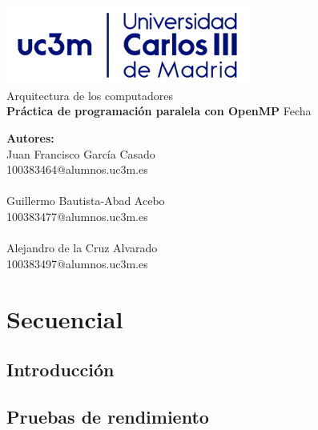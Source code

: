 \documentclass[12pt]{article}
\begin{document}
    \begin{center}
    \includegraphics[width=80mm]{uc3m.png}
    \\ \vspace{40mm}
    \LARGE Arquitectura de los computadores
    \\ \vspace{5mm} 
    \hline
    \vspace{2mm}
    \textbf{\Huge Práctica de programación paralela con OpenMP}
    \vspace{2mm}
    \hline
    \vspace{5mm}
    \large Fecha
    \end{center}
    \vspace{20mm}
    \textbf{\large Autores:}
    \normalsize \\
    Juan Francisco García Casado\\100383464@alumnos.uc3m.es
    \\ \\
    Guillermo Bautista-Abad Acebo\\100383477@alumnos.uc3m.es
    \\ \\
    Alejandro de la Cruz Alvarado\\100383497@alumnos.uc3m.es
    \newpage
    \tableofcontents
    \newpage
    \section{Secuencial}
        \subsection{Introducción}
        \noindent
        \subsection{Pruebas de rendimiento}
        \noindent
    \newpage
\end{document}
